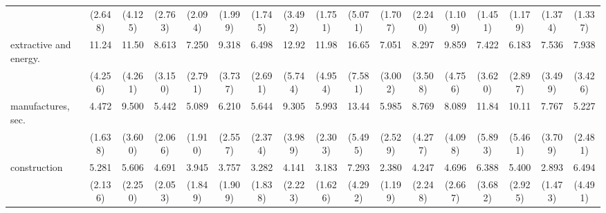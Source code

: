 {\begin{tabular}{l*{16}{c}}
                    &     (2.648)         &     (4.125)         &     (2.763)         &     (2.094)         &     (1.999)         &     (1.745)         &     (3.492)         &     (1.751)         &     (5.071)         &     (1.707)         &     (2.240)         &     (1.109)         &     (1.451)         &     (1.179)         &     (1.374)         &     (1.337)         \\
[1em]
extractive and energy.&       11.24\sym{***}&       11.50\sym{***}&       8.613\sym{***}&       7.250\sym{***}&       9.318\sym{***}&       6.498\sym{***}&       12.92\sym{***}&       11.98\sym{***}&       16.65\sym{***}&       7.051\sym{***}&       8.297\sym{***}&       9.859\sym{***}&       7.422\sym{***}&       6.183\sym{***}&       7.536\sym{***}&       7.938\sym{***}\\
                    &     (4.256)         &     (4.261)         &     (3.150)         &     (2.791)         &     (3.737)         &     (2.691)         &     (5.744)         &     (4.954)         &     (7.581)         &     (3.002)         &     (3.508)         &     (4.756)         &     (3.620)         &     (2.897)         &     (3.499)         &     (3.426)         \\
[1em]
manufactures, sec.  &       4.472\sym{***}&       9.500\sym{***}&       5.442\sym{***}&       5.089\sym{***}&       6.210\sym{***}&       5.644\sym{***}&       9.305\sym{***}&       5.993\sym{***}&       13.44\sym{***}&       5.985\sym{***}&       8.769\sym{***}&       8.089\sym{***}&       11.84\sym{***}&       10.11\sym{***}&       7.767\sym{***}&       5.227\sym{***}\\
                    &     (1.638)         &     (3.600)         &     (2.066)         &     (1.910)         &     (2.557)         &     (2.374)         &     (3.989)         &     (2.303)         &     (5.495)         &     (2.529)         &     (4.277)         &     (4.098)         &     (5.893)         &     (5.461)         &     (3.709)         &     (2.481)         \\
[1em]
construction        &       5.281\sym{***}&       5.606\sym{***}&       4.691\sym{***}&       3.945\sym{**} &       3.757\sym{**} &       3.282\sym{*}  &       4.141\sym{**} &       3.183\sym{*}  &       7.293\sym{***}&       2.380         &       4.247\sym{**} &       4.696\sym{**} &       6.388\sym{**} &       5.400\sym{**} &       2.893\sym{*}  &       6.494\sym{**} \\
                    &     (2.136)         &     (2.250)         &     (2.053)         &     (1.849)         &     (1.909)         &     (1.838)         &     (2.223)         &     (1.626)         &     (4.292)         &     (1.199)         &     (2.248)         &     (2.667)         &     (3.682)         &     (2.925)         &     (1.473)         &     (4.491)         \\

\end{tabular}}
